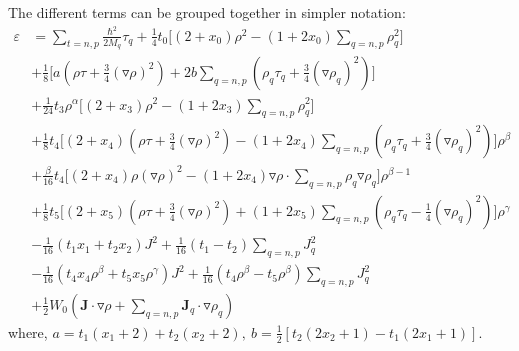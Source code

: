 \documentclass[preprint,prc,preprintnumbers,superscriptaddress,amsmath,amssymb,floatfix]{revtex4-1}
\begin{document}
The different terms can be grouped together in simpler notation:
\begin{equation}
 \begin{split}
  \varepsilon &= \sum_{t=n,p}\frac{\hbar^2}{2M_q}\tau_q+\frac{1}{4}t_0\Big[(2+x_0)\rho^2-(1+2x_0)\sum_{q=n,p}\rho^2_q\Big]\\
  &+\frac{1}{8}\Big[ a (\rho \tau+\frac{3}{4}(\triangledown \rho)^2)+2b\sum_{q=n,p}(\rho_q \tau_q+\frac{3}{4}(\triangledown \rho_q)^2)\Big]\\
  &+\frac{1}{24}t_3\rho^{\alpha}\Big[(2+x_3)\rho^2-(1+2x_3)\sum_{q=n,p}\rho_q^2\Big]\\
  &+\frac{1}{8}t_4\Big[ (2+x_4)(\rho \tau+\frac{3}{4}(\triangledown \rho)^2)-(1+2x_4)\sum_{q=n,p}(\rho_q \tau_q+\frac{3}{4}(\triangledown \rho_q)^2)\Big]\rho^{\beta}\\
 &+\frac{\beta}{16}t_4\Big[(2+x_4)\rho(\triangledown \rho)^2-(1+2x_4)\mathbf{\triangledown}\rho \cdot \sum_{q=n,p}\rho_q\mathbf{\triangledown}\rho_q\Big]\rho^{\beta-1}\\
 &+\frac{1}{8}t_5\Big[ (2+x_5)(\rho \tau+\frac{3}{4}(\triangledown \rho)^2)+(1+2x_5)\sum_{q=n,p}(\rho_q \tau_q-\frac{1}{4}(\triangledown \rho_q)^2)\Big]\rho^{\gamma}\\
 &-\frac{1}{16}(t_1x_1+t_2x_2)J^2+\frac{1}{16}(t_1-t_2)\sum_{q=n,p}J^2_q\\
 &-\frac{1}{16}(t_4 x_4\rho^{\beta}+t_5x_5\rho^{\gamma})J^2+\frac{1}{16}(t_4\rho^{\beta}-t_5\rho^{\beta})\sum_{q=n,p}J^2_q\\
 &+\frac{1}{2} W_0 (\mathbf{J}\cdot \mathbf{\triangledown}\rho+\sum_{q=n,p}\mathbf{J}_q\cdot \mathbf{\triangledown}\rho_q)
 \end{split}
\end{equation}
where, $a = t_1(x_1+2)+t_2(x_2+2), \ b= \frac{1}{2}[t_2(2 x_2+1)-t_1(2x_1+1)]$.
\end{document}
